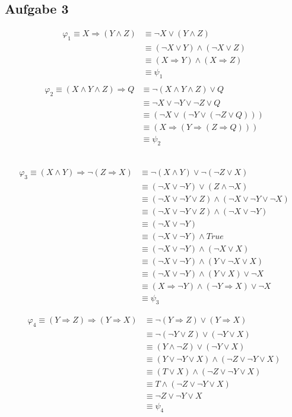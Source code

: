 \documentclass[a4paper,10pt]{article}
\begin{document}
	\subsection*{Aufgabe 3}
	\begin{align*}
	\varphi_1 \equiv X \Rightarrow (Y \wedge Z) 
	&\equiv \neg X \vee (Y \wedge Z) \\
	&\equiv (\neg X \vee Y) \wedge (\neg X \vee Z) \\
	&\equiv (X \Rightarrow Y) \wedge (X \Rightarrow Z) \\
	&\equiv \psi_1 \\
	\end{align*}
	\begin{align*}
	\varphi_2 \equiv (X \wedge Y \wedge Z) \Rightarrow Q 
	&\equiv \neg (X \wedge Y \wedge Z) \vee Q \\
	&\equiv \neg X \vee \neg Y \vee \neg Z \vee Q \\
	&\equiv (\neg X \vee (\neg Y \vee (\neg Z \vee Q))) \\
	&\equiv (X \Rightarrow (Y \Rightarrow (Z \Rightarrow Q))) \\
	&\equiv \psi_2 
	\end{align*}	 \
	
	\begin{align*}
	\varphi_3 \equiv (X \wedge Y) \Rightarrow \neg (Z \Rightarrow X) 
	&\equiv \neg (X \wedge Y) \vee \neg (\neg Z \vee X)  \\
	&\equiv (\neg X \vee \neg Y) \vee (Z \wedge \neg X)  \\
	&\equiv (\neg X \vee \neg Y \vee Z) \wedge (\neg X \vee \neg Y \vee \neg X)  \\
	&\equiv (\neg X \vee \neg Y \vee Z) \wedge (\neg X \vee \neg Y)  \\
	&\equiv (\neg X \vee \neg Y) \\
	&\equiv (\neg X \vee \neg Y) \wedge True \\
	&\equiv (\neg X \vee \neg Y) \wedge (\neg X \vee X) \\
	&\equiv (\neg X \vee \neg Y) \wedge (Y \vee \neg X \vee X) \\
	&\equiv (\neg X \vee \neg Y) \wedge (Y \vee X) \vee \neg X \\
	&\equiv (X \Rightarrow \neg Y) \wedge (\neg Y \Rightarrow X) \vee \neg X \\
	&\equiv \psi_3 
	\end{align*}
	
	\begin{align*}
	\varphi_4 \equiv (Y \Rightarrow Z) \Rightarrow (Y \Rightarrow X) 
	&\equiv \neg (Y \Rightarrow Z) \vee (Y \Rightarrow X) \\
	&\equiv \neg (\neg Y \vee Z) \vee (\neg Y \vee X) \\
	&\equiv (Y \wedge \neg Z) \vee (\neg Y \vee X) \\
	&\equiv (Y \vee \neg Y \vee X) \wedge (\neg Z \vee \neg Y \vee X)\\
	&\equiv (T \vee X) \wedge (\neg Z \vee \neg Y \vee X)\\
	&\equiv T \wedge (\neg Z \vee \neg Y \vee X)\\
	&\equiv \neg Z \vee \neg Y \vee X\\
	&\equiv \psi_4 
	\end{align*}
	
\end{document}
